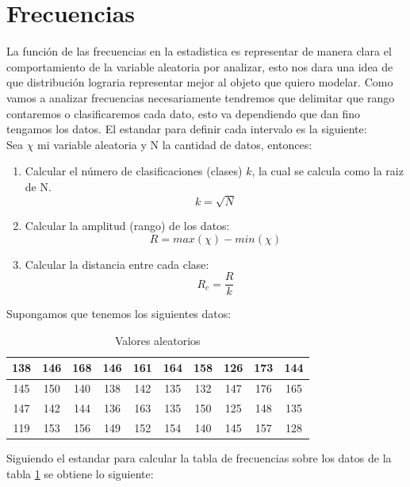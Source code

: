 \section{Frecuencias}
La función de las frecuencias en la estadistica es representar de manera clara el comportamiento de la variable aleatoria por analizar, esto nos dara una idea de que distribución lograria representar mejor al objeto que quiero modelar. Como vamos a analizar frecuencias necesariamente tendremos que delimitar que rango contaremos o clasificaremos cada dato, esto va dependiendo que dan fino tengamos los datos. El estandar para definir cada intervalo es la siguiente:\\
Sea $\chi$ mi variable aleatoria y N la cantidad de datos, entonces:
\begin{enumerate}
    \item Calcular el número de clasificaciones (clases) $k$, la cual se calcula como la raiz de N.
          \begin{equation*}
              k=\sqrt{N}
          \end{equation*}
    \item Calcular la amplitud (rango) de los datos:
          \begin{equation*}
              R=max(\chi)-min(\chi)
          \end{equation*}
    \item Calcular la distancia entre cada clase:
          \begin{equation*}
              R_c = \frac{R}{k}
          \end{equation*}
\end{enumerate}
Supongamos que tenemos los siguientes datos:
\begin{table}[H]
    \centering
    \begin{tabular}{|cccccccccc|}
        \hline
        138 & 146 & 168 & 146 & 161 & 164 & 158 & 126 & 173 & 144 \\\hline
        145 & 150 & 140 & 138 & 142 & 135 & 132 & 147 & 176 & 165 \\\hline
        147 & 142 & 144 & 136 & 163 & 135 & 150 & 125 & 148 & 135 \\\hline
        119 & 153 & 156 & 149 & 152 & 154 & 140 & 145 & 157 & 128 \\\hline
    \end{tabular}
    \caption{Valores aleatorios}
    \label{table:valores_aleatorios_introduccion}
\end{table}
Siguiendo el estandar para calcular la tabla de frecuencias sobre los datos de la tabla \ref{table:valores_aleatorios_introduccion} se obtiene lo siguiente:\\

